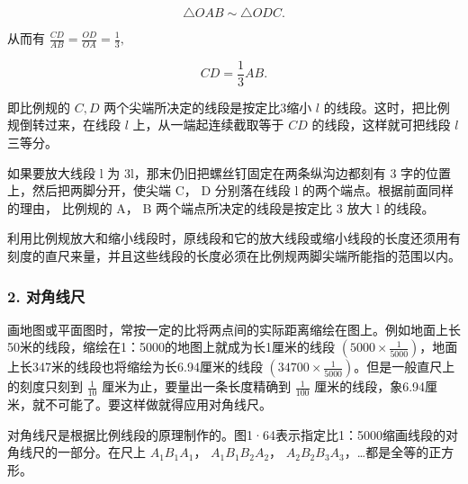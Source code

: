 \[
\triangle O A B \sim \triangle O D C.
\]

从而有 \(\frac{CD}{AB} = \frac{OD}{OA} = \frac{1}{3},\)

\[
C D = \frac {1}{3} A B.
\]

即比例规的 \(C, D\) 两个尖端所决定的线段是按定比3缩小 \(l\)
的线段。这时，把比例规倒转过来，在线段 \(l\) 上，从一端起连续截取等于
\(CD\) 的线段，这样就可把线段 \(l\) 三等分。

如果要放大线段 l 为 3l，那末仍旧把螺丝钉固定在两条纵沟边都刻有 3
字的位置上，然后把两脚分开，使尖端 C， D 分别落在线段 l
的两个端点。根据前面同样的理由， 比例规的 A， B
两个端点所决定的线段是按定比 3 放大 l 的线段。

利用比例规放大和缩小线段时，原线段和它的放大线段或缩小线段的长度还须用有刻度的直尺来量，并且这些线段的长度必须在比例规两脚尖端所能指的范围以内。

\subsubsection{2. 对角线尺}

画地图或平面图时，常按一定的比将两点间的实际距离缩绘在图上。例如地面上长50米的线段，缩绘在1：5000的地图上就成为长1厘米的线段
\(\left(5000\times\frac{1}{5000}\right)\)，地面上长347米的线段也将缩绘为长6.94厘米的线段
\(\left(34700\times\frac{1}{5000}\right)\)。但是一般直尺上的刻度只刻到
\(\frac{1}{10}\) 厘米为止，要量出一条长度精确到 \(\frac{1}{100}\)
厘米的线段，象6.94厘米，就不可能了。要这样做就得应用对角线尺。

对角线尺是根据比例线段的原理制作的。图1·64表示指定比1：5000缩画线段的对角线尺的一部分。在尺上
\(A_{1}B_{1}A_{1}\)， \(A_{1}B_{1}B_{2}A_{2}\)，
\(A_{2}B_{2}B_{3}A_{3}\)，\ldots 都是全等的正方形。

